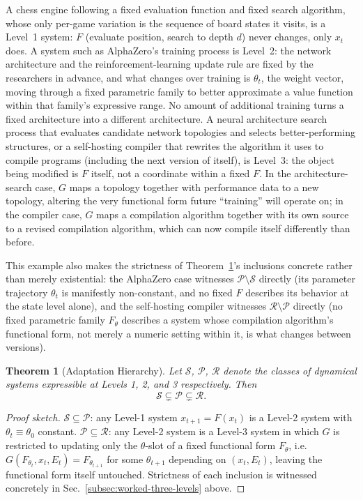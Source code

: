 \documentclass[11pt,a4paper]{article}
\theoremstyle{plain}
\newtheorem{theorem}{Theorem}[section]
\theoremstyle{definition}
\theoremstyle{remark}
\begin{document}
A chess engine following a fixed evaluation function and fixed search algorithm, whose only per-game variation is the sequence of board states it visits, is a Level~1 system: $F$ (evaluate position, search to depth $d$) never changes, only $x_t$ does. A system such as AlphaZero's training process is Level~2: the network architecture and the reinforcement-learning update rule are fixed by the researchers in advance, and what changes over training is $\theta_t$, the weight vector, moving through a fixed parametric family to better approximate a value function within that family's expressive range. No amount of additional training turns a fixed architecture into a different architecture. A neural architecture search process that evaluates candidate network topologies and selects better-performing structures, or a self-hosting compiler that rewrites the algorithm it uses to compile programs (including the next version of itself), is Level~3: the object being modified is $F$ itself, not a coordinate within a fixed $F$. In the architecture-search case, $G$ maps a topology together with performance data to a new topology, altering the very functional form future ``training'' will operate on; in the compiler case, $G$ maps a compilation algorithm together with its own source to a revised compilation algorithm, which can now compile itself differently than before.

This example also makes the strictness of Theorem~\ref{thm:adaptation-hierarchy}'s inclusions concrete rather than merely existential: the AlphaZero case witnesses $\mathcal{P}\setminus\mathcal{S}$ directly (its parameter trajectory $\theta_t$ is manifestly non-constant, and no fixed $F$ describes its behavior at the state level alone), and the self-hosting compiler witnesses $\mathcal{R}\setminus\mathcal{P}$ directly (no fixed parametric family $F_\theta$ describes a system whose compilation algorithm's functional form, not merely a numeric setting within it, is what changes between versions).

\begin{theorem}[Adaptation Hierarchy]
\label{thm:adaptation-hierarchy}
Let $\mathcal{S}$, $\mathcal{P}$, $\mathcal{R}$ denote the classes of dynamical systems expressible at Levels 1, 2, and 3 respectively. Then
\[
\mathcal{S} \subsetneq \mathcal{P} \subsetneq \mathcal{R}.
\]
\end{theorem}

\begin{proof}[Proof sketch]
$\mathcal{S} \subseteq \mathcal{P}$: any Level-1 system $x_{t+1}=F(x_t)$ is a Level-2 system with $\theta_t \equiv \theta_0$ constant. $\mathcal{P} \subseteq \mathcal{R}$: any Level-2 system is a Level-3 system in which $G$ is restricted to updating only the $\theta$-slot of a fixed functional form $F_\theta$, i.e.\ $G(F_{\theta_t}, x_t, E_t) = F_{\theta_{t+1}}$ for some $\theta_{t+1}$ depending on $(x_t, E_t)$, leaving the functional form itself untouched. Strictness of each inclusion is witnessed concretely in Sec.~\ref{subsec:worked-three-levels} above.
\end{proof}
\end{document}
